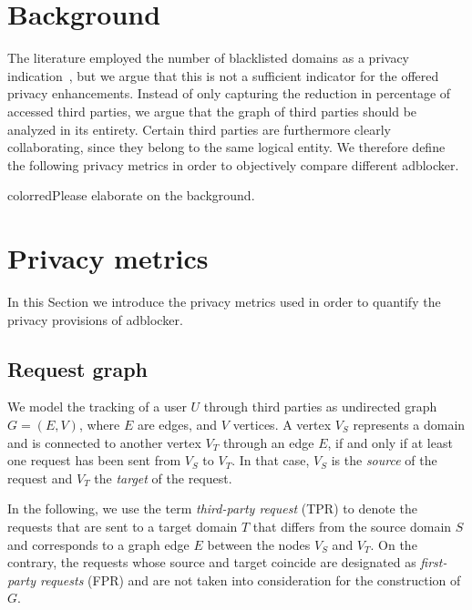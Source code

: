 \documentclass{sig-alternate}
\begin{document}
\section{Background} \label{sec:background}
The literature employed the number of blacklisted domains as a privacy indication~\cite{XX}, but we argue that this is not a sufficient indicator for the offered privacy enhancements. Instead of only capturing the reduction in percentage of accessed third parties, we argue that the graph of third parties should be analyzed in its entirety. Certain third parties are furthermore clearly collaborating, since they belong to the same logical entity. We therefore define the following privacy metrics in order to objectively compare different adblocker.

{color{red}Please elaborate on the background. }

\section{Privacy metrics} \label{sec:privacy_metrics}
In this Section we introduce the privacy metrics used in order to quantify the privacy provisions of adblocker.


\subsection{Request graph} \label{sec:graph_definition}
We model the tracking of a user $U$ through third parties as undirected graph $G=(E,V)$, where $E$ are edges, and $V$ vertices. A vertex $V_S$ represents a domain and is connected to another vertex $V_T$ through an edge $E$, if and only if at least one request has been sent from $V_S$ to $V_T$. In that case, $V_S$ is the \textit{source} of the request and $V_T$ the \textit{target} of the request.

In the following, we use the term \textit{third-party request} (TPR) to denote the requests that are sent to a target domain $T$ that differs from the source domain $S$ and corresponds to a graph edge $E$ between the nodes $V_S$ and $V_T$. On the contrary, the requests whose source and target coincide are designated as \textit{first-party requests} (FPR) and are not taken into consideration for the construction of $G$.
\end{document}
